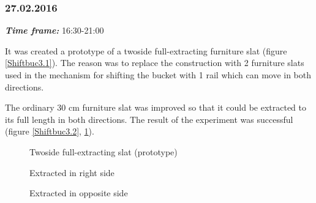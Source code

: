 \subsubsection{27.02.2016}
\textit{\textbf{Time frame:}} 16:30-21:00 

It was created a prototype of a twoside full-extracting furniture slat (figure \ref{Shiftbuc3.1}). The reason was to replace the construction with 2 furniture slats used in the mechanism for shifting the bucket with 1 rail which can move in both directions.

The ordinary 30 cm furniture slat was improved so that it could be extracted to its full length in both directions. The result of the experiment was successful (figure \ref{Shiftbuc3.2}, \ref{Shiftbuc3.3}). 

\begin{figure}[H]
	\begin{minipage}[h]{1\linewidth}
		\caption{Twoside full-extracting slat (prototype)}
		\label{Shiftbuc3.1}
	\end{minipage}
	\hfill
	\begin{minipage}[h]{1\linewidth}
		\caption{Extracted in right side}
		\label{Shiftbuc3.2}
	\end{minipage}
	\hfill
	\begin{minipage}[h]{1\linewidth}
		\caption{Extracted in opposite side}
		\label{Shiftbuc3.3}
	\end{minipage}
\end{figure}
